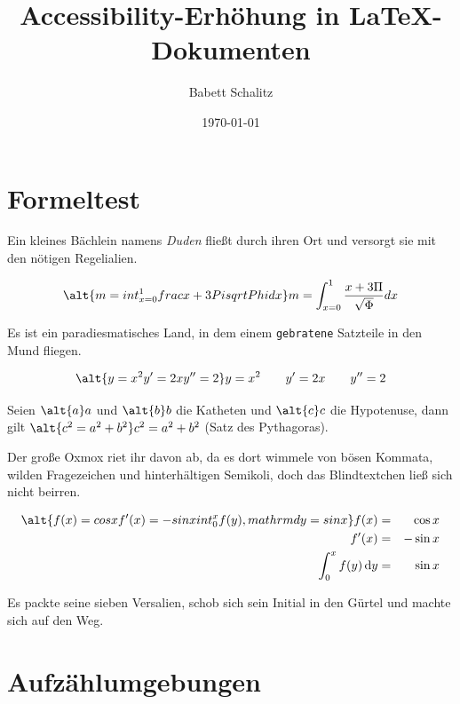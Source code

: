 \documentclass[%
	12pt,%
	a4paper,%
	oneside,%
	listof=totoc,
 	index=totoc,
	bibliography = totoc,
	parskip = half,%
	chapterprefix=false,%
	appendixprefix, %
	headings=small,%
]{scrreprt}
\title{Accessibility-Erhöhung in \LaTeX-Dokumenten}
\author{Babett Schalitz}
\date{\today}
\begin{document}
\maketitle

\tableofcontents

\listoffigures
\listoftables

\chapter{Formeltest}
\label{sec:Formeltest}

Ein kleines Bächlein namens \emph{Duden} fließt durch ihren Ort und versorgt sie mit den nötigen Regelialien.

\[ \alt{m = int^{1}_{x=0}{frac{x + 3 Pi}{sqrt{Phi}}} dx} m = \int^{1}_{x=0}{\frac{x + 3 \Pi}{\sqrt{\Phi}}} dx \]

Es ist ein paradiesmatisches Land, in dem einem \texttt{gebratene} Satzteile in den Mund fliegen.

\begin{displaymath}
\alt{y=x^{2} y'=2x y''=2}
y=x^{2} \qquad
y'=2x \qquad
y''=2
\end{displaymath}

Seien \(\alt{a}a\) und \(\alt{b}b\) die Katheten und \(\alt{c}c\) die Hypotenuse, dann gilt \(\alt{c^{2}=a^{2}+b^{2}} c^{2}=a^{2}+b^{2}\) (Satz des Pythagoras).

Der große Oxmox riet ihr davon ab, da es dort wimmele von bösen Kommata, wilden Fragezeichen und hinterhältigen Semikoli, doch das Blindtextchen ließ sich nicht beirren.

\begin{eqnarray}
\alt{f(x) = cos x  f'(x) = -sin x   int_{0}^{x} f(y),mathrm{d}y = sin x}
f(x) & = & \cos x \\
f'(x) & = & -\sin x \\
\int_{0}^{x} f(y)\,\mathrm{d}y &
= & \sin x
\end{eqnarray}

Es packte seine sieben Versalien, schob sich sein Initial in den Gürtel und machte sich auf den Weg.

\chapter{Aufzählumgebungen}
\label{sec:Aufzaehlumgebung}
\end{document}

